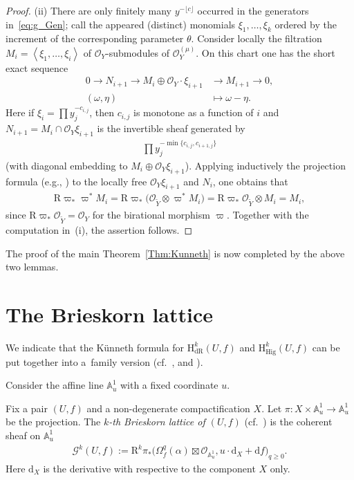 \documentclass[pdftex]{sigma}
\renewcommand{\AA}{\mathbb{A}}
\newcommand{\sG}{\mathscr{G}}
\newcommand{\sO}{\mathscr{O}}
\newcommand{\de}{\mathrm{d}}
\newcommand{\dR}{\mathrm{dR}}
\newcommand{\Hig}{\mathrm{Hig}}
\newcommand{\coH}{\mathrm{H}}
\newcommand{\cpt}{compactification}
\newcommand{\flr}[1]{\lfloor #1 \rfloor}
\newcommand{\gen}[1]{\left\langle #1 \right\rangle}
\newcommand{\RD}{\mathrm{R}}
\begin{document}
\begin{proof}
(ii) There are only finitely many $y^{-\flr{c}}$ occurred in the generators in~\eqref{eq:g_Gen}; call the appeared (distinct) monomials $\xi_1,\dots,\xi_k$ ordered by the increment of the corresponding parameter $\theta$.
Consider locally the filtration $M_i = \gen{\xi_1,\dots,\xi_i}$ of $\sO_Y$-submodules of $\sO_Y^{(\mu)}$. On this chart one has the short exact sequence
\begin{align*}
0 \to N_{i+1} \to M_i\oplus \sO_Y\cdot\xi_{i+1} & \to M_{i+1} \to 0, \\
(\omega, \eta) & \mapsto \omega - \eta.
\end{align*}
Here if $\xi_i = \prod y_j^{-c_{i,j}}$, then $c_{i,j}$ is monotone as a function of $i$ and $N_{i+1} = M_i\cap \sO_Y\xi_{i+1}$ is the invertible sheaf generated by
\begin{gather*} \prod y_j^{-\min\{c_{i,j}, c_{i+1,j} \}} \end{gather*}
(with diagonal embedding to $M_i\oplus \sO_Y\xi_{i+1}$). Applying inductively the projection formula (e.g., \cite[Exercise~III.8.3]{H}) to the locally free $\sO_Y\xi_{i+1}$ and $N_i$, one obtains that
\begin{gather*} \RD\varpi_*\varpi^*M_i= \RD\varpi_*\big(\sO_{\widetilde{Y}}\otimes\varpi^*M_i\big)= \RD\varpi_*\sO_{\widetilde{Y}}\otimes M_i = M_i, \end{gather*}
since $\RD\varpi_*\sO_{\widetilde{Y}} = \sO_Y$ for the birational morphism $\varpi$. Together with the computation in~(i), the assertion follows.
\end{proof}

The proof of the main Theorem~\ref{Thm:Kunneth} is now completed by the above two lemmas.

\section{The Brieskorn lattice}\label{sect:BL}

We indicate that the K\"unneth formula for $\coH_\dR^k(U,f)$ and $\coH_\Hig^k(U,f)$ can be put together into a~family version (cf.~\cite[Sections~1.3 ans~6.2]{SY}, \cite[Section~3.2]{KKP} and \cite{M_Kont}).

Consider the affine line $\AA^1_u$ with a fixed coordinate $u$.

Fix a pair $(U,f)$ and a non-degenerate {\cpt} $X$. Let $\pi\colon X\times \AA^1_u \to \AA^1_u$ be the projection. The \textit{$k$-th Brieskorn lattice of $(U,f)$} (cf.~\cite[Section~6.1]{SY}) is the coherent sheaf on $\AA^1_u$
\begin{gather*} \sG^k(U,f) := \RD^k\pi_*\big(\Omega_f^q(\alpha)\boxtimes\sO_{\AA^1_u},	u\cdot\de_X +\de f \big)_{q\geq 0}. \end{gather*}
Here $\de_X$ is the derivative with respective to the component $X$ only.
\end{document}
